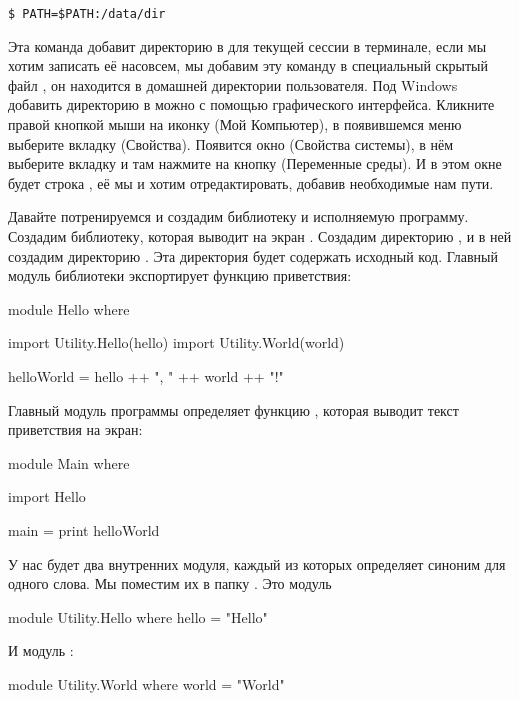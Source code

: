 \begin{verbatim}
$ PATH=$PATH:/data/dir
\end{verbatim}

Эта команда добавит директорию в  для текущей сессии в
терминале, если мы хотим записать её насовсем, мы добавим эту команду в
специальный скрытый файл , он находится в домашней
директории пользователя. Под Windows добавить директорию в 
можно с помощью графического интерфейса. Кликните правой кнопкой мыши на
иконку  (Мой Компьютер), в появившемся меню выберите
вкладку  (Свойства). Появится окно 
(Свойства системы), в нём выберите вкладку  и там нажмите
на кнопку  (Переменные среды). И в этом окне
будет строка , её мы и хотим отредактировать, добавив
необходимые нам пути.

Давайте потренируемся и создадим библиотеку и исполняемую программу.
Создадим библиотеку, которая выводит на экран . Создадим
директорию , и в ней создадим директорию . Эта
директория будет содержать исходный код. Главный модуль библиотеки
экспортирует функцию приветствия:


\begin{code}
module Hello where

import Utility.Hello(hello)
import Utility.World(world)

helloWorld = hello ++ ", " ++ world ++ "!"
\end{code}

Главный модуль программы  определяет функцию ,
которая выводит текст приветствия на экран:


\begin{code}
module Main where

import Hello 

main = print helloWorld
\end{code}

У нас будет два внутренних модуля, каждый из которых определяет синоним
для одного слова. Мы поместим их в папку . Это модуль


\begin{code}
module Utility.Hello where
hello = "Hello"
\end{code}

И модуль :


\begin{code}
module Utility.World where
world = "World"
\end{code}

